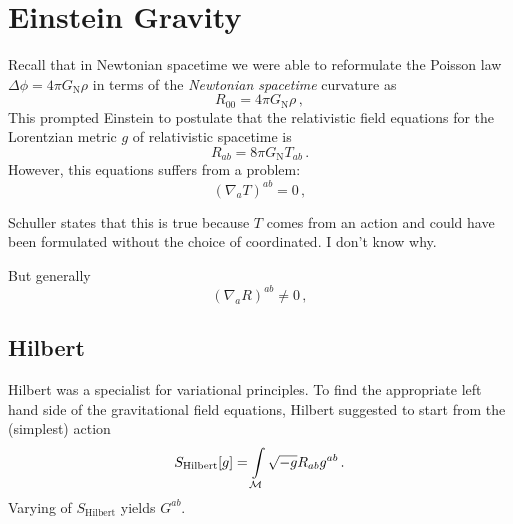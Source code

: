 \section{Einstein Gravity}
Recall that in Newtonian spacetime we were able to reformulate the Poisson law
$\Delta \phi = 4 \pi G_\text{N} \rho$
in terms of the \textit{Newtonian spacetime} curvature as
\begin{equation*}
    R_{00} = 4 \pi G_\text{N} \rho\,,
\end{equation*}
This prompted Einstein to postulate that the relativistic field 
equations for the Lorentzian metric $g$ of relativistic spacetime
is 
\begin{equation*}
    R_{ab} = 8 \pi G_\text{N} T_{ab}\,.
\end{equation*}
However, this equations suffers from a problem:
\begin{equation*}
    (\nabla_a T)^{ab} = 0\,,
\end{equation*}
\begin{note}
    Schuller states that this is true because $T$ comes from an action and
    could have been formulated without the choice of coordinated.
    I don't know why.
\end{note}
But generally
\begin{equation*}
    (\nabla_a R)^{ab} \neq 0\,,
\end{equation*}
\subsection{Hilbert}
Hilbert was a specialist for variational principles.
To find the appropriate left hand side of the gravitational field equations,
Hilbert suggested to start from the (simplest) action
\begin{equation}
    S_\text{Hilbert}[g] = \int\limits_{\mathcal{M}} \sqrt{-g} R_{ab}g^{ab}\,.
\end{equation}
Varying of $S_\text{Hilbert}$ yields $G^{ab}$.

